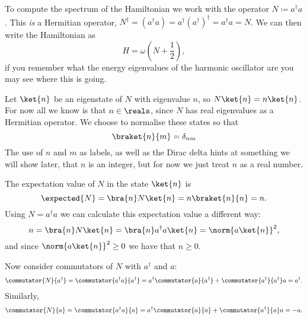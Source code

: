 \documentclass[fleqn]{NotesClass}
\newcommand{\hermit}{{\dagger}}
\begin{document}
    To compute the spectrum of the Hamiltonian we work with the operator \(N \coloneqq a^\hermit a\).
    This \emph{is} a Hermitian operator, \(N^\hermit = (a^\hermit a) = a^\hermit (a^\hermit)^\hermit = a^\hermit a = N\).
    We can then write the Hamiltonian as
    \begin{equation}
        H = \omega\left( N + \frac{1}{2} \right),
    \end{equation}
    if you remember what the energy eigenvalues of the harmonic oscillator are you may see where this is going.
    
    Let \(\ket{n}\) be an eigenstate of \(N\) with eigenvalue \(n\), so \(N\ket{n} = n\ket{n}\).
    For now all we know is that \(n \in \reals\), since \(N\) has real eigenvalues as a Hermitian operator.
    We choose to normalise these states so that
    \begin{equation}
        \braket{n}{m} = \delta_{nm}
    \end{equation}
    The use of \(n\) and \(m\) as labels, as well as the Dirac delta hints at something we will show later, that \(n\) is an integer, but for now we just treat \(n\) as a real number.
    
    The expectation value of \(N\) in the state \(\ket{n}\) is
    \begin{equation}
        \expected{N} = \bra{n}N\ket{n} = n\braket{n}{n} = n.
    \end{equation}
    Using \(N = a^\hermit a\) we can calculate this expectation value a different way:
    \begin{equation}
        n = \bra{n} N \ket{n} = \bra{n} a^\hermit a \ket{n} = \norm{a \ket{n}}^2,
    \end{equation}
    and since \(\norm{a \ket{n}}^2 \ge 0\) we have that \(n \ge 0\).
    
    Now consider commutators of \(N\) with \(a^\hermit\) and \(a\):
    \begin{align}
        \commutator{N}{a^\hermit} = \commutator{a^\hermit a}{a^\hermit} = a^\hermit \commutator{a}{a^\hermit} + \commutator{a^\hermit}{a^\hermit}a = a^\hermit.
    \end{align}
    Similarly,
    \begin{equation}
        \commutator{N}{a} = \commutator{a^\hermit a}{a} = a^\hermit\commutator{a}{a} + \commutator{a^\hermit}{a}a = -a.
    \end{equation}
    
\end{document}
